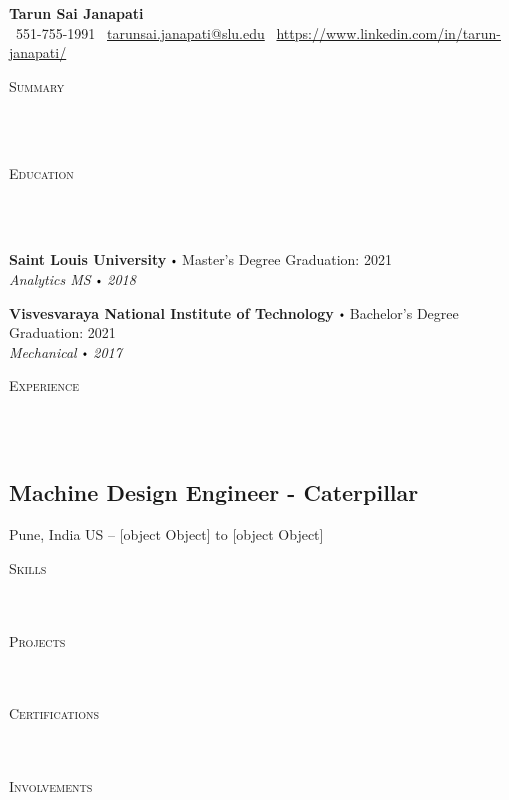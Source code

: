 \documentclass{article}
\newcommand{\school}[4]{
        \textbf{#1} \labelitemi #2 \hfill #3 \\ #4 \vspace*{5pt}
      }
\newcommand{\lineunder}{
        \vspace*{-8pt} \\ \hspace*{-18pt} 
        \hrulefill \\
        }
\newcommand{\header}[1]{{
        \hspace*{-15pt}\vspace*{6pt} \textsc{#1}} \vspace*{-6pt} 
        \lineunder
        }
\renewcommand{\labelitemi}{
        $\vcenter{\hbox{\tiny$\bullet$}}$\hspace*{3pt}
        }
\begin{document}
  
      \small
      \smallskip
      \vspace*{-44pt}
  
      \begin{center}
        {\LARGE \textbf{Tarun Sai Janapati}} \\
        \faPhone\ 551-755-1991 \quad
        \faEnvelope\ \href{mailto:tarunsai.janapati@slu.edu}{tarunsai.janapati@slu.edu} \quad
        \faLinkedin\ \url{https://www.linkedin.com/in/tarun-janapati/}
      \end{center}
  
      \vspace*{4pt}%
      \header{Summary}
  
      \vspace{15pt}
  
     \header{Education}
  
      {
        \school{Saint Louis University}{Master's Degree}{Graduation: 2021}{\textit{Analytics MS \labelitemi 2018}}
        

        \school{Visvesvaraya National Institute of Technology}{Bachelor's Degree}{Graduation: 2021}{\textit{Mechanical \labelitemi 2017}}
        }
  
      \vspace*{4pt}%
      \header{Experience}
  
      {
            \subsection*{Machine Design Engineer - Caterpillar}
            Pune, India US -- [object Object] to [object Object]
           
          }
      \vspace*{4pt}%
      \header{Skills}

  
      \vspace*{4pt}%
      \header{Projects}
  
      \vspace*{4pt}%
      \header{Certifications}
  
      \vspace*{4pt}%
      \header{Involvements}
  
  
      
\end{document}

